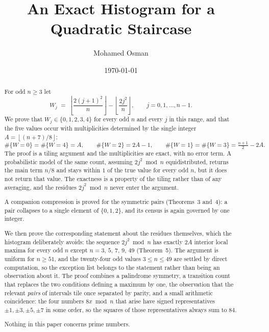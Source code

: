 \documentclass[11pt,reqno]{amsart}
\theoremstyle{plain}
\theoremstyle{remark}
\numberwithin{equation}{section}
\newcommand{\fl}[1]{\left\lfloor #1 \right\rfloor}
\begin{document}
\title[An exact histogram for a quadratic staircase]
      {An Exact Histogram for a Quadratic Staircase}


\author{Mohamed Osman}
\address{Independent researcher}

\date{\today}

\begin{abstract}
For odd $n \ge 3$ let
\[
  W_j \;=\; \fl{\frac{2(j+1)^2}{n}} - \fl{\frac{2j^2}{n}},
  \qquad j = 0,1,\dots,n-1 .
\]
We prove that $W_j \in \{0,1,2,3,4\}$ for every odd $n$ and every $j$ in this
range, and that the five values occur with multiplicities determined by the
single integer $A = \fl{(n+7)/8}$:
\[
  \#\{W{=}0\} = \#\{W{=}4\} = A, \qquad \#\{W{=}2\} = 2A-1, \qquad
  \#\{W{=}1\} = \#\{W{=}3\} = \tfrac{n+1}{2} - 2A .
\]
The proof is a tiling argument and the multiplicities are exact, with no error
term. A probabilistic model of the same count, assuming $2j^2 \bmod n$
equidistributed, returns the main term $n/8$ and stays within $1$ of the true
value for every odd $n$, but it does not return that value. The exactness is a
property of the tiling rather than of any averaging, and the residues
$2j^2 \bmod n$ never enter the argument.

A companion compression is proved for the symmetric pairs (Theorems~3 and~4):
a pair collapses to a single element of $\{0,1,2\}$, and its census is again
governed by one integer.

We then prove the corresponding statement about the residues themselves, which
the histogram deliberately avoids: the sequence $2j^2 \bmod n$ has exactly $2A$
interior local maxima for every odd $n$ except $n = 3,\,5,\,7,\,9,\,49$
(Theorem~5). The argument is uniform for $n \ge 51$, and the twenty-four odd
values $3 \le n \le 49$ are settled by direct computation, so the exception list
belongs to the statement rather than being an observation about it. The proof
combines a palindrome symmetry, a transition count that replaces the two
conditions defining a maximum by one, the observation that the relevant
\emph{pairs} of intervals tile once separated by parity, and a small arithmetic
coincidence: the four numbers $8x \bmod n$ that arise have signed
representatives $\pm1,\pm3,\pm5,\pm7$ in some order, so the squares of those
representatives always sum to $84$.

Nothing in this paper concerns prime numbers.
\end{abstract}
\end{document}
